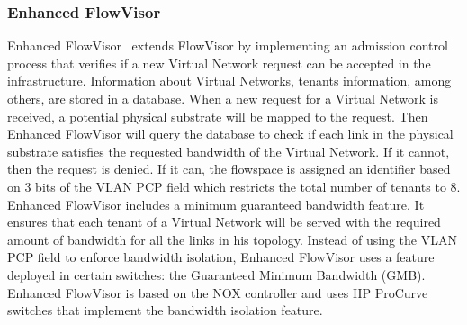 \subsubsection{Enhanced FlowVisor}
Enhanced FlowVisor~\cite{EnhancedFV-Min2012} extends FlowVisor by implementing an admission control process that verifies if a new Virtual Network request can be accepted in the infrastructure. 
Information about Virtual Networks, tenants information, among others, are stored in a database. When a new request for a Virtual Network is received, a potential physical substrate will be mapped to the request. Then Enhanced FlowVisor will query the database to check if each link in the physical substrate satisfies the requested bandwidth of the Virtual Network. If it cannot, then the request is denied. 
If it can, the flowspace is assigned an identifier based on 3 bits of the VLAN PCP field which restricts the total number of tenants to 8.
Enhanced FlowVisor includes a minimum guaranteed bandwidth feature. It ensures that each tenant of a Virtual Network will be served with the required amount of bandwidth for all the links in his topology.
Instead of using the VLAN PCP field to enforce bandwidth isolation, Enhanced FlowVisor uses a feature deployed in certain switches: the Guaranteed Minimum Bandwidth (GMB).
Enhanced FlowVisor is based on the NOX controller and uses HP ProCurve switches that implement the bandwidth isolation feature.


